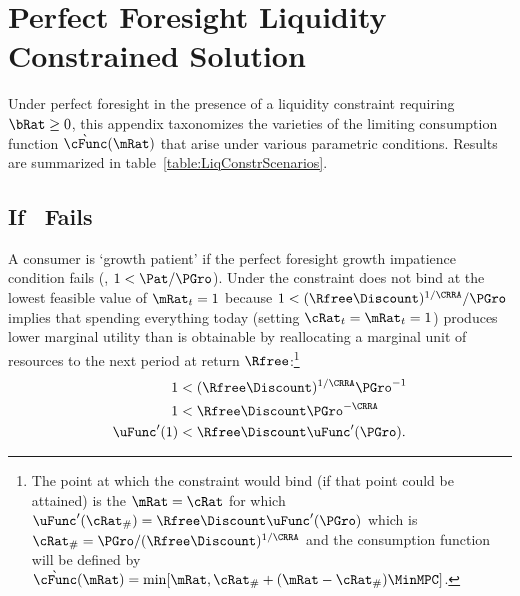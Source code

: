 \documentclass[\econtexRoot/BufferStockTheory]{subfiles}
\begin{document}
\let\TableWidth\relax
\newlength\TableWidth
\providecommand{\FigDir}{\econtexRoot/Code/Mathematica/Results/BufferStockTheory/Figures}

\section{Perfect Foresight Liquidity Constrained Solution}\label{sec:ApndxLiqConstr}

Under perfect foresight in the presence of a liquidity constraint requiring $\bRat
\geq 0$, this appendix taxonomizes the varieties of the limiting
consumption function $\grave{\cFunc}(\mRat)$ that arise under various parametric conditions.  Results are summarized in table~\ref{table:LiqConstrScenarios}.



\subsection{If \PFGIC~Fails}

A consumer is `growth patient' if the perfect foresight growth
impatience condition fails (\cncl{\PFGIC}, $1 < \Pat/\PGro$).  Under
\cncl{\PFGIC} the constraint does not bind at the lowest feasible value of $\mRat_{t}=1$ because
$1 < (\Rfree\Discount)^{1/\CRRA}/\PGro$ implies that spending
everything today (setting $\cRat_{t}=\mRat_{t}=1$) produces lower
marginal utility than is obtainable by reallocating a marginal unit of
resources to the next period at return $\Rfree$:\footnote{The point at
  which the constraint would bind (if that point could be attained) is
  the $\mRat=\cRat$ for which $\uFunc^{\prime}(\cRat_{\#}) = \Rfree
  \Discount \uFunc^{\prime}(\PGro)$ which is $\cRat_{\#} =
  \PGro/(\Rfree \Discount)^{1/\CRRA}$ and the consumption function
  will be defined by
  $\grave{\cFunc}(\mRat)=\min[\mRat,\cRat_{\#}+(\mRat-\cRat_{\#})\MinMPC
  ]$.}
\begin{equation}\begin{gathered}\begin{aligned}
  1  & < (\Rfree \Discount)^{1/\CRRA}\PGro^{-1}     
  \\ 1  & < \Rfree \Discount \PGro^{-\CRRA}  
  \\  \uFunc^{\prime}(1)  & < \Rfree \Discount \uFunc^{\prime}(\PGro)   \label{eq:EulerPFGICFailsEnd}.
\end{aligned}\end{gathered}\end{equation}
\end{document}

